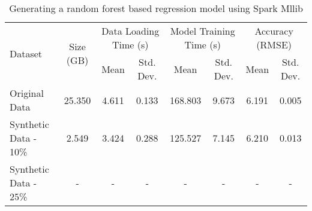 \begin{table*}
    \renewcommand{\arraystretch}{1.3}
    \caption{Generating a random forest based regression model using Spark Mllib}
    \label{tab:resource-util}
    \begin{center}
        \begin{tabularx}{0.98\textwidth}{|X|c|c|c|c|c|c|c|}
            \hline
            \multirow{2}{*}{Dataset} & \multirow{2}{*}{Size (GB)} & \multicolumn{2}{c|}{\cellcolor[gray]{0.7}Data Loading Time (s)} &\multicolumn{2}{c|}{\cellcolor[gray]{0.7}Model Training Time (s)} & \multicolumn{2}{c|}{\cellcolor[gray]{0.7}Accuracy (RMSE)}\\
            \cline{3-8}
             & & \cellcolor[gray]{0.9}Mean & \cellcolor[gray]{0.9}Std. Dev.  &  \cellcolor[gray]{0.9}Mean & \cellcolor[gray]{0.9}Std. Dev. &  \cellcolor[gray]{0.9}Mean & \cellcolor[gray]{0.9}Std. Dev. \\
            \hline
            Original Data & 25.350 & 4.611 & 0.133 & 168.803 & 9.673 & 6.191 & 0.005 \\
            \hline
            Synthetic Data - 10\% & 2.549 & 3.424 & 0.288 & 125.527 & 7.145 & 6.210 & 0.013 \\
            \hline
            Synthetic Data - 25\% & - & - & - & - & - & - & - \\
            \hline
		\end{tabularx}
	\end{center}
\end{table*}
